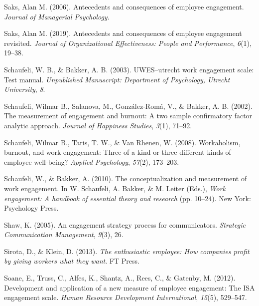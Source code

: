 \documentclass[
  man]{apa6}
\newlength{\cslhangindent}
\newlength{\cslentryspacingunit} %
\newenvironment{CSLReferences}[2] %
 {%
  \setlength{\parindent}{0pt}
  \ifodd #1
  \let\oldpar\par
  \def\par{\hangindent=\cslhangindent\oldpar}
  \fi
  \setlength{\parskip}{#2\cslentryspacingunit}
 }%
 {}
\begin{document}
\begin{CSLReferences}{1}{0}
\leavevmode{}%
Saks, Alan M. (2006). Antecedents and consequences of employee engagement. \emph{Journal of Managerial Psychology}.

\leavevmode{}%
Saks, Alan M. (2019). Antecedents and consequences of employee engagement revisited. \emph{Journal of Organizational Effectiveness: People and Performance}, \emph{6}(1), 19--38.

\leavevmode{}%
Schaufeli, W. B., \& Bakker, A. B. (2003). {UWES}--utrecht work engagement scale: Test manual. \emph{Unpublished Manuscript: Department of Psychology, Utrecht University}, \emph{8}.

\leavevmode{}%
Schaufeli, Wilmar B., Salanova, M., González-Romá, V., \& Bakker, A. B. (2002). The measurement of engagement and burnout: A two sample confirmatory factor analytic approach. \emph{Journal of Happiness Studies}, \emph{3}(1), 71--92.

\leavevmode{}%
Schaufeli, Wilmar B., Taris, T. W., \& Van Rhenen, W. (2008). Workaholism, burnout, and work engagement: Three of a kind or three different kinds of employee well-being? \emph{Applied Psychology}, \emph{57}(2), 173--203.

\leavevmode{}%
Schaufeli, W., \& Bakker, A. (2010). The conceptualization and measurement of work engagement. In W. Schaufeli, A. Bakker, \& M. Leiter (Eds.), \emph{Work engagement: A handbook of essential theory and research} (pp. 10--24). New York: Psychology Press.

\leavevmode{}%
Shaw, K. (2005). An engagement strategy process for communicators. \emph{Strategic Communication Management}, \emph{9}(3), 26.

\leavevmode{}%
Sirota, D., \& Klein, D. (2013). \emph{The enthusiastic employee: How companies profit by giving workers what they want}. FT Press.

\leavevmode{}%
Soane, E., Truss, C., Alfes, K., Shantz, A., Rees, C., \& Gatenby, M. (2012). Development and application of a new measure of employee engagement: The ISA engagement scale. \emph{Human Resource Development International}, \emph{15}(5), 529--547.


\end{CSLReferences}
\end{document}
